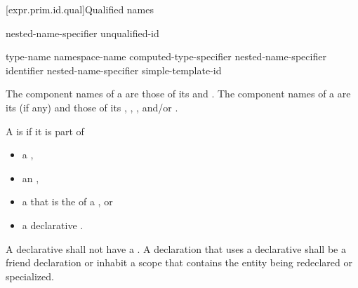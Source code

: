 [expr.prim.id.qual]{Qualified names}

%
%
%
\begin{bnf}
\br
    nested-name-specifier  unqualified-id
\end{bnf}

%
%
%
\begin{bnf}
\br
    \terminal{::}\br
    type-name \terminal{::}\br
    namespace-name \terminal{::}\br
    computed-type-specifier \terminal{::}\br
    nested-name-specifier identifier \terminal{::}\br
    nested-name-specifier  simple-template-id \terminal{::}
\end{bnf}

\pnum
{}%
The component names of a  are those of
its  and .
The component names of a  are
its  (if any) and those of its
,
,
, and/or
.

\pnum
A  is  if it is part of
\begin{itemize}
\item
a ,
\item
an ,
\item
a 
that is the  of a , or
\item
a declarative .
\end{itemize}
A declarative 
shall not have a .
A declaration that uses a declarative 
shall be a friend declaration or
inhabit a scope that contains the entity being redeclared or specialized.

